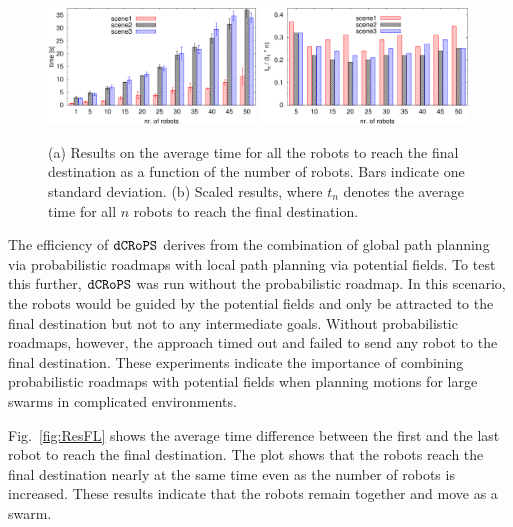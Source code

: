 \documentclass[letterpaper, 10pt, conference]{ieeeconf}
\newcommand{\Acronym}[1]{\ensuremath{{\small{\texttt{#1}}}}}
\newcommand{\Name}{\Acronym{dCRoPS}}
\begin{document}
\begin{figure}
\centering
\includegraphics[width=0.49\textwidth]{figs/figResT}
\includegraphics[width=0.49\textwidth]{figs/figResST}
\caption{(a) Results on the average time for all the robots to reach the
  final destination as a function of the number of robots. Bars
  indicate one standard deviation. (b) Scaled results, where $t_n$
  denotes the average time for all $n$ robots to reach the final destination.}
\label{fig:ResT}
\end{figure}

\noindent
The efficiency of $\Name$ derives from the combination of global path
planning via probabilistic roadmaps with local path planning via
potential fields.  To test this further, $\Name$ was run without the
probabilistic roadmap. In this scenario, the robots would be guided by
the potential fields and only be attracted to the final destination
but not to any intermediate goals. Without probabilistic roadmaps,
however, the approach timed out and failed to send any robot to the
final destination. These experiments indicate the importance of
combining probabilistic roadmaps with potential fields when planning
motions for large swarms in complicated environments.


Fig.~\ref{fig:ResFL} shows the average time difference between the
first and the last robot to reach the final destination. The plot
shows that the robots reach the final destination nearly at the same
time even as the number of robots is increased. These results indicate
that the robots remain together and move as a swarm.  
\end{document}
